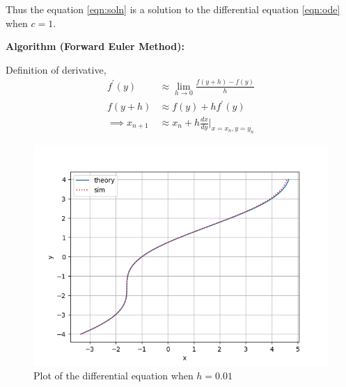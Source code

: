 \documentclass[journal]{IEEEtran}
\begin{document}
Thus the equation \eqref{eqn:soln} is a solution to the differential equation \eqref{eqn:ode} when $c = 1$.

\medskip

\textbf{Algorithm (Forward Euler Method):}

Definition of derivative,
\begin{align}
    f^\prime(y) &\approx \lim_{h\to0}\frac{f(y+h)-f(y)}{h} \\
    f(y+h) &\approx f(y)+hf^\prime(y) \\
    \implies x_{n+1} &\approx x_{n} + h\frac{dx}{dy}\Big|_{x=x_{n}, y=y_{n}}
\end{align}

\begin{figure}[h]
    \centering
    \includegraphics[width=\columnwidth]{figs/plot.png}
    \caption{Plot of the differential equation when $h=0.01$}
    \label{fig:Plot1}
    \end{figure}
\end{document}
